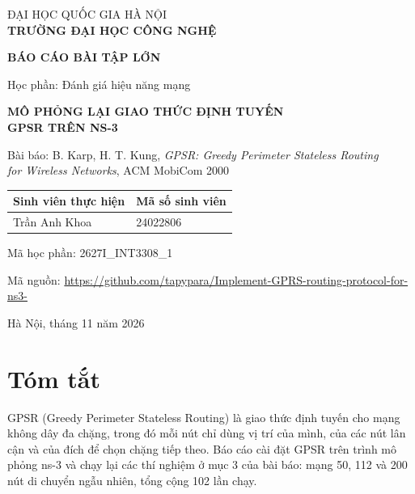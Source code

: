 \documentclass[a4paper,13pt]{extreport}
\begin{document}
\begin{titlepage}
\centering
{}
{\large ĐẠI HỌC QUỐC GIA HÀ NỘI\\ \textbf{TRƯỜNG ĐẠI HỌC CÔNG NGHỆ}\par}
\vspace{1.8cm}
{\Large \textbf{BÁO CÁO BÀI TẬP LỚN}\par}
\vspace{0.4cm}
{\large Học phần: Đánh giá hiệu năng mạng\par}
\vspace{2.2cm}
{\LARGE \textbf{MÔ PHỎNG LẠI GIAO THỨC ĐỊNH TUYẾN\\[4pt] GPSR TRÊN NS-3}\par}
\vspace{1.2cm}
{\normalsize Bài báo: B. Karp, H. T. Kung, \textit{GPSR: Greedy Perimeter Stateless Routing\\ for Wireless Networks}, ACM MobiCom 2000\par}
\vspace{2.5cm}
\begin{tabular}{ll}
\toprule
\textbf{Sinh viên thực hiện} & \textbf{Mã số sinh viên}\\
\midrule
Trần Anh Khoa & 24022806\\
\bottomrule
\end{tabular}

\vspace{0.4cm}
Mã học phần: 2627I\_INT3308\_1

\vspace{0.6cm}
Mã nguồn: \url{https://github.com/tapypara/Implement-GPRS-routing-protocol-for-ns3-}
\vfill
{Hà Nội, tháng 11 năm 2026\par}
\end{titlepage}

\chapter*{Tóm tắt}

GPSR (Greedy Perimeter Stateless Routing) là giao thức định tuyến cho mạng không dây đa chặng, trong đó mỗi nút chỉ dùng vị trí của mình, của các nút lân cận và của đích để chọn chặng tiếp theo. Báo cáo cài đặt GPSR trên trình mô phỏng ns-3 và chạy lại các thí nghiệm ở mục 3 của bài báo: mạng 50, 112 và 200 nút di chuyển ngẫu nhiên, tổng cộng 102 lần chạy.
\end{document}
